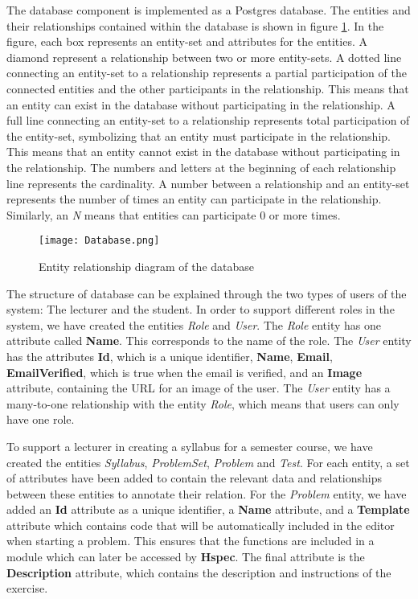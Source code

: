 The database component is implemented as a Postgres database. The entities and their relationships contained within the database is shown in figure \ref{fig:Database}. In the figure, each box represents an entity-set and attributes for the entities. A diamond represent a relationship between two or more entity-sets.
A dotted line connecting an entity-set to a relationship represents a partial participation of the connected entities and the other participants in the relationship. This means that an entity can exist in the database without participating in the relationship.
A full line connecting an entity-set to a relationship represents total participation of the entity-set, symbolizing that an entity must participate in the relationship.
This means that an entity cannot exist in the database without participating in the relationship.
The numbers and letters at the beginning of each relationship line represents the cardinality. A number between a relationship and an entity-set represents the number of times an entity can participate in the relationship. Similarly, an \textit{N} means that entities can participate $0$ or more times.

\begin{figure}[H]
	\texttt{[image: Database.png]}
	\centering
	\caption{Entity relationship diagram of the database}
	\label{fig:Database}
\end{figure}

The structure of database can be explained through the two types of users of the system: The lecturer and the student.
In order to support different roles in the system, we have created the entities \textit{Role} and \textit{User}. The \textit{Role} entity has one attribute called \textbf{Name}. This corresponds to the name of the role. The \textit{User} entity has the attributes \textbf{Id}, which is a unique identifier, \textbf{Name}, \textbf{Email}, \textbf{EmailVerified}, which is true when the email is verified, and an \textbf{Image} attribute, containing the URL for an image of the user. The \textit{User} entity has a many-to-one relationship with the entity \textit{Role}, which means that users can only have one role.

To support a lecturer in creating a syllabus for a semester course, we have created the entities \textit{Syllabus}, \textit{ProblemSet}, \textit{Problem} and \textit{Test}. For each entity, a set of attributes have been added to contain the relevant data and relationships between these entities to annotate their relation.
For the \textit{Problem} entity, we have added an \textbf{Id} attribute as a unique identifier, a \textbf{Name} attribute, and a \textbf{Template} attribute which contains code that will be automatically included in the editor when starting a problem. This ensures that the functions are included in a module which can later be accessed by \textbf{Hspec}. The final attribute is the \textbf{Description} attribute, which contains the description and instructions of the exercise.

